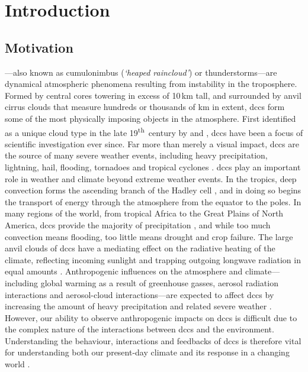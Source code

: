 \chapter{Introduction} \label{chp:introduction}

\section{Motivation}

---also known as cumulonimbus (\textit{`heaped raincloud'}) or thunderstorms---are dynamical atmospheric phenomena resulting from instability in the troposphere.
Formed by central cores towering in excess of 10\,\unit{km} tall, and surrounded by anvil cirrus clouds that measure hundreds or thousands of km in extent, \acrshort{dcc}s form some of the most physically imposing objects in the atmosphere.
First identified as a unique cloud type in the late 19\textsuperscript{th}~century by \citet{abercromby_identity_1887} and \citet{hildebrandsson_remarks_1887}, \acrshort{dcc}s have been a focus of scientific investigation ever since.
Far more than merely a visual impact, \acrshort{dcc}s are the source of many severe weather events, including heavy precipitation, lightning, hail, flooding, tornadoes and tropical cyclones \citep{westra_future_2014, houze_chapter_2014, williams_radar_1992, bruning_theory_2013, punge_hail_2016, matsudo_severe_2011}.
\acrshort{dcc}s play an important role in weather and climate beyond extreme weather events.
In the tropics, deep convection forms the ascending branch of the Hadley cell \citep{riehl_heat_1958}, and in doing so begins the transport of energy through the atmosphere from the equator to the poles.
In many regions of the world, from tropical Africa to the Great Plains of North America, \acrshort{dcc}s provide the majority of precipitation \citep{feng_global_2021}, and while too much convection means flooding, too little means drought and crop failure.
The large anvil clouds of \acrshort{dcc}s have a mediating effect on the radiative heating of the climate, reflecting incoming sunlight and trapping outgoing longwave radiation in equal amounts \citep{ramanathan_cloud-radiative_1989, hartmann_effect_1992, hartmann_tropical_2016}.
Anthropogenic influences on the atmosphere and climate---including global warming as a result of greenhouse gasses, aerosol radiation interactions and aerosol-cloud interactions---are expected to affect \acrshort{dcc}s by increasing the amount of heavy precipitation and related severe weather \citep[e.g.][]{allen_constraints_2002, trenberth_changing_2003, held_robust_2006, khain2005aerosol, koren_smoke_2008, rosenfeld_flood_2008, fan_microphysical_2013, fan_review_2016}.
However, our ability to observe anthropogenic impacts on \acrshort{dcc}s is difficult due to the complex nature of the interactions between \acrshort{dcc}s and the environment.
Understanding the behaviour, interactions and feedbacks of \acrshort{dcc}s is therefore vital for understanding both our present-day climate and its response in a changing world \citep{bony_clouds_2015, sherwood_assessment_2020}.

